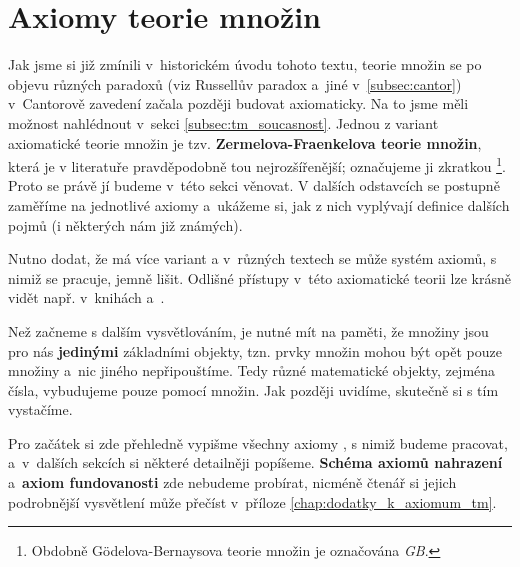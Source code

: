 \chapter{Axiomy teorie množin}\label{chap:axiomy_tm}
Jak jsme si již zmínili v~historickém úvodu tohoto textu, teorie množin se po objevu různých paradoxů (viz Russellův paradox a~jiné v~\ref{subsec:cantor}) v~Cantorově zavedení začala později budovat axiomaticky. Na to jsme měli možnost nahlédnout v~sekci \ref{subsec:tm_soucasnost}. Jednou z variant axiomatické teorie množin je tzv. \textbf{\mbox{Zermelova-Fraenkelova} teorie množin}, která je v literatuře pravděpodobně tou nejrozšířenější; označujeme ji zkratkou \emph{\ZF{}}\footnote{Obdobně Gödelova-Bernaysova teorie množin je označována \emph{\textsf{GB}}.}. Proto se právě jí budeme v~této sekci věnovat. V dalších odstavcích se postupně zaměříme na jednotlivé axiomy \ZF{} a~ukážeme si, jak z nich vyplývají definice dalších pojmů (i některých nám již známých).\par
Nutno dodat, že \ZF{} má více variant a v~různých textech se může systém axiomů, s nimiž se pracuje, jemně lišit. Odlišné přístupy v~této axiomatické teorii lze krásně vidět např. v~knihách \cite{BalcarStepanek1986} a~\cite{Goldrei2017}.\par
Než začneme s dalším vysvětlováním, je nutné mít na paměti, že množiny jsou pro nás \textbf{jedinými} základními objekty, tzn. prvky množin mohou být opět pouze množiny a~nic jiného nepřipouštíme. Tedy různé matematické objekty, zejména čísla, vybudujeme pouze pomocí množin. Jak později uvidíme, skutečně si s tím vystačíme.\par
Pro začátek si zde přehledně vypišme všechny axiomy \ZF{}, s nimiž budeme pracovat, a~v~dalších sekcích si některé detailněji popíšeme. \textbf{Schéma axiomů nahrazení} a~\textbf{axiom fundovanosti} zde nebudeme probírat, nicméně čtenář si jejich podrobnější vysvětlení může přečíst v~příloze \ref{chap:dodatky_k_axiomum_tm}.
\medskip

